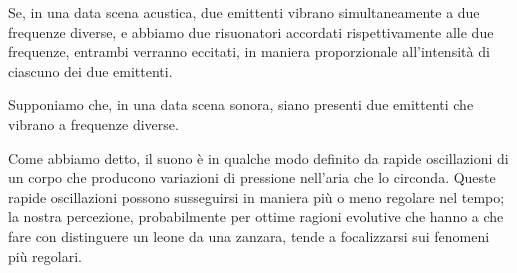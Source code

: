 \documentclass[11pt]{report}
\begin{document}
Se, in una data scena acustica, due emittenti vibrano simultaneamente a due frequenze diverse, e abbiamo due risuonatori accordati rispettivamente alle due frequenze, entrambi verranno eccitati, in maniera proporzionale all'intensità di ciascuno dei due emittenti. 


Supponiamo che, in una data scena sonora, siano presenti due emittenti che vibrano a frequenze diverse. 



Come abbiamo detto, il suono è in qualche modo definito da rapide oscillazioni di un corpo che producono variazioni di pressione nell'aria che lo circonda. Queste rapide oscillazioni possono susseguirsi in maniera più o meno regolare nel tempo; la nostra percezione, probabilmente per ottime ragioni evolutive che hanno a che fare con distinguere un leone da una zanzara, tende a focalizzarsi sui fenomeni più regolari. 
\end{document}
